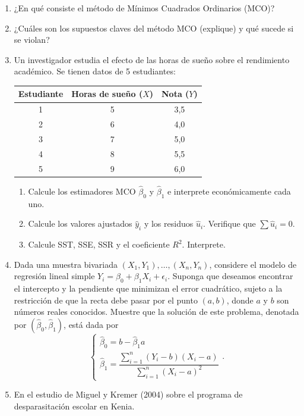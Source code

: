 \documentclass[letterpaper,11pt]{article}
\begin{document}
\begin{enumerate}
\item ¿En qué consiste el método de Mínimos Cuadrados Ordinarios (MCO)?


\item ¿Cuáles son los supuestos claves del método MCO (explique) y qué sucede si se violan?

\item Un investigador estudia el efecto de las horas de sueño sobre el rendimiento académico. Se tienen datos de 5 estudiantes:
\begin{center}
    \begin{tabular}{| c | c | c |}
\hline
\textbf{Estudiante} & \textbf{Horas de sueño ($X$)} & \textbf{Nota ($Y$)} \\ \hline
1 & 5 & 3,5 \\
2 & 6 & 4,0 \\
3 & 7 & 5,0 \\
4 & 8 & 5,5 \\
5 & 9 & 6,0 \\ \hline
\end{tabular}
\end{center}
\begin{enumerate}[label=(\alph*)]
    \item Calcule los estimadores MCO $\hat{\beta}_0$ y $\hat{\beta}_1$ e interprete económicamente cada uno.
    \item Calcule los valores ajustados $\hat{y}_i$ y los residuos $\hat{u}_i$. Verifique que $\sum \hat{u}_i = 0$.
    \item Calcule SST, SSE, SSR y el coeficiente $R^2$. Interprete.
\end{enumerate}

\item Dada una muestra bivariada $(X_1, Y_1), \ldots, (X_n, Y_n)$, considere el modelo de regresión lineal simple $Y_i = \beta_0 + \beta_1 X_i + \epsilon_i$. Suponga que deseamos encontrar el intercepto y la pendiente que minimizan el error cuadrático, sujeto a la restricción de que la recta debe pasar por el punto $(a,b)$, donde $a$ y $b$ son números reales conocidos. Muestre que la solución de este problema, denotada por $(\widehat{\beta}_0, \widehat{\beta}_1)$, está dada por
\[
\begin{cases}
    \widehat{\beta}_0 = b - \widehat{\beta}_1 a \\[6pt]
    \widehat{\beta}_1 = \dfrac{\sum_{i=1}^{n} (Y_i - b)(X_i - a)}{\sum_{i=1}^{n} (X_i - a)^2}
\end{cases}.
\]

\item En el estudio de Miguel y Kremer (2004) sobre el programa de desparasitación escolar en Kenia.
   



\end{enumerate}
\end{document}
